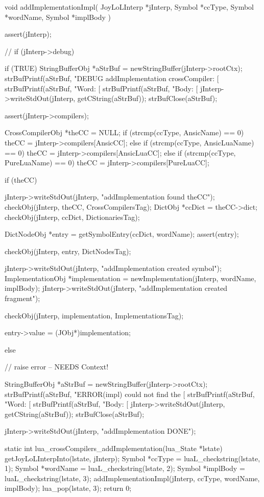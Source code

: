 \startCCode
void addImplementationImpl(
  JoyLoLInterp *jInterp,
  Symbol       *ccType,
  Symbol       *wordName,
  Symbol       *implBody
) {
  assert(jInterp);
  
//  if (jInterp->debug) {
  if (TRUE) {
    StringBufferObj *aStrBuf = newStringBuffer(jInterp->rootCtx);
    strBufPrintf(aStrBuf, 
      "DEBUG addImplementation crossCompiler: [%
    strBufPrintf(aStrBuf, "Word: [%
    strBufPrintf(aStrBuf, "Body: [%
    jInterp->writeStdOut(jInterp, getCString(aStrBuf));
    strBufClose(aStrBuf);
  }
  
  assert(jInterp->compilers);

  CrossCompilerObj *theCC = NULL;
  if (strcmp(ccType, AnsicName) == 0) {
    theCC = jInterp->compilers[AnsicCC];
  } else if (strcmp(ccType, AnsicLuaName) == 0) {
    theCC = jInterp->compilers[AnsicLuaCC];
  } else if (strcmp(ccType, PureLuaName) == 0) {
    theCC = jInterp->compilers[PureLuaCC];
  }
  
  if (theCC) {
    jInterp->writeStdOut(jInterp, "addImplementation found theCC\n");
    checkObj(jInterp, theCC, CrossCompilersTag);
    DictObj *ccDict = theCC->dict;
    checkObj(jInterp, ccDict, DictionariesTag);
    
    DictNodeObj *entry = getSymbolEntry(ccDict, wordName);
    assert(entry);
    
    checkObj(jInterp, entry, DictNodesTag);
    
    jInterp->writeStdOut(jInterp, "addImplementation created symbol\n");
    ImplementationObj *implementation =
      newImplementation(jInterp, wordName, implBody);
    jInterp->writeStdOut(jInterp, "addImplementation created fragment\n");
    
    checkObj(jInterp, implementation, ImplementationsTag);
    
    entry->value = (JObj*)implementation;
  } else {
    // raise error -- NEEDS Context!
    
    StringBufferObj *aStrBuf = newStringBuffer(jInterp->rootCtx);
    strBufPrintf(aStrBuf, 
      "ERROR(impl) could not find the [%
    strBufPrintf(aStrBuf, "Word: [%
    strBufPrintf(aStrBuf, "Body: [%
    jInterp->writeStdOut(jInterp, getCString(aStrBuf));
    strBufClose(aStrBuf);
  }
  jInterp->writeStdOut(jInterp, "addImplementation DONE\n");
}

static int lua_crossCompilers_addImplementation(lua_State *lstate) {
  getJoyLoLInterpInto(lstate, jInterp);
  Symbol *ccType   = luaL_checkstring(lstate, 1);
  Symbol *wordName = luaL_checkstring(lstate, 2);
  Symbol *implBody = luaL_checkstring(lstate, 3);
  addImplementationImpl(jInterp, ccType, wordName, implBody);
  lua_pop(lstate, 3);
  return 0;
}
\stopCCode
\stopTestSuite

}
